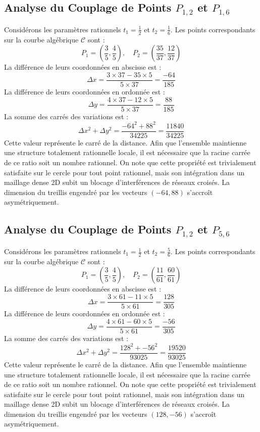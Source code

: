 \documentclass[12pt, a4paper]{article}
\begin{document}
\subsection{Analyse du Couplage de Points $P_{1,2}$ et $P_{1,6}$}
Considérons les paramètres rationnels $t_1 = \frac{1}{2}$ et $t_2 = \frac{1}{6}$.
Les points correspondants sur la courbe algébrique $\mathcal{C}$ sont :
$$ P_1 = \left( \frac{3}{5}, \frac{4}{5} \right), \quad P_2 = \left( \frac{35}{37}, \frac{12}{37} \right) $$
La différence de leurs coordonnées en abscisse est :
$$ \Delta x = \frac{3 \times 37 - 35 \times 5}{5 \times 37} = \frac{-64}{185} $$
La différence de leurs coordonnées en ordonnée est :
$$ \Delta y = \frac{4 \times 37 - 12 \times 5}{5 \times 37} = \frac{88}{185} $$
La somme des carrés des variations est :
$$ \Delta x^2 + \Delta y^2 = \frac{ -64^2 + 88^2 }{ 34225 } = \frac{ 11840 }{ 34225 } $$
Cette valeur représente le carré de la distance. Afin que l'ensemble maintienne une structure totalement rationnelle locale, il est nécessaire que la racine carrée de ce ratio soit un nombre rationnel. On note que cette propriété est trivialement satisfaite sur le cercle pour tout point rationnel, mais son intégration dans un maillage dense 2D subit un blocage d'interférences de réseaux croisés. La dimension du treillis engendré par les vecteurs $( -64, 88 )$ s'accroît asymétriquement.


\subsection{Analyse du Couplage de Points $P_{1,2}$ et $P_{5,6}$}
Considérons les paramètres rationnels $t_1 = \frac{1}{2}$ et $t_2 = \frac{5}{6}$.
Les points correspondants sur la courbe algébrique $\mathcal{C}$ sont :
$$ P_1 = \left( \frac{3}{5}, \frac{4}{5} \right), \quad P_2 = \left( \frac{11}{61}, \frac{60}{61} \right) $$
La différence de leurs coordonnées en abscisse est :
$$ \Delta x = \frac{3 \times 61 - 11 \times 5}{5 \times 61} = \frac{128}{305} $$
La différence de leurs coordonnées en ordonnée est :
$$ \Delta y = \frac{4 \times 61 - 60 \times 5}{5 \times 61} = \frac{-56}{305} $$
La somme des carrés des variations est :
$$ \Delta x^2 + \Delta y^2 = \frac{ 128^2 + -56^2 }{ 93025 } = \frac{ 19520 }{ 93025 } $$
Cette valeur représente le carré de la distance. Afin que l'ensemble maintienne une structure totalement rationnelle locale, il est nécessaire que la racine carrée de ce ratio soit un nombre rationnel. On note que cette propriété est trivialement satisfaite sur le cercle pour tout point rationnel, mais son intégration dans un maillage dense 2D subit un blocage d'interférences de réseaux croisés. La dimension du treillis engendré par les vecteurs $( 128, -56 )$ s'accroît asymétriquement.
\end{document}
